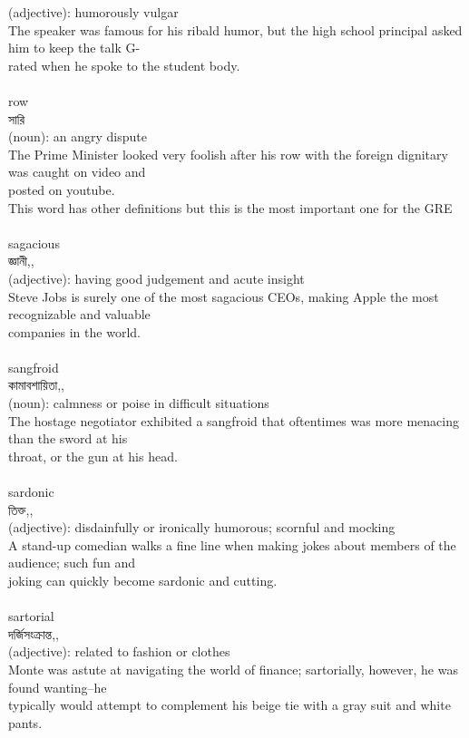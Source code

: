 \documentclass{article}
\begin{document}
{{(adjective): humorously vulgar\\The speaker was famous for his ribald humor, but the high school principal asked him to keep the talk G-\\rated when he spoke to the student body.\\}\\
{row}\\
{সারি}\\
{(noun): an angry dispute\\The Prime Minister looked very foolish after his row with the foreign dignitary was caught on video and\\posted on youtube.\\This word has other definitions but this is the most important one for the GRE\\}\\
{sagacious}\\
{জ্ঞানী,,}\\
{(adjective): having good judgement and acute insight\\Steve Jobs is surely one of the most sagacious CEOs, making Apple the most recognizable and valuable\\companies in the world.\\}\\
{sangfroid}\\
{কামাবশায়িতা,,}\\
{(noun): calmness or poise in difficult situations\\The hostage negotiator exhibited a sangfroid that oftentimes was more menacing than the sword at his\\throat, or the gun at his head.\\}\\
{sardonic}\\
{তিক্ত,,}\\
{(adjective): disdainfully or ironically humorous; scornful and mocking\\A stand-up comedian walks a fine line when making jokes about members of the audience; such fun and\\joking can quickly become sardonic and cutting.\\}\\
{sartorial}\\
{দর্জিসংক্রান্ত,,}\\
{(adjective): related to fashion or clothes\\Monte was astute at navigating the world of finance; sartorially, however, he was found wanting--he\\typically would attempt to complement his beige tie with a gray suit and white pants.\\}\\
}
\end{document}
